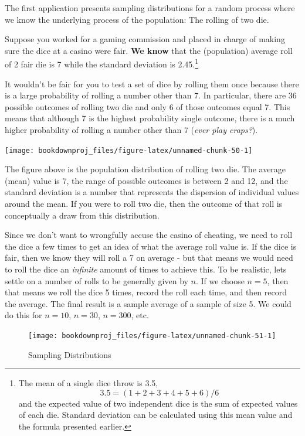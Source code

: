 \documentclass[
]{book}
\begin{document}
The first application presents sampling distributions for a random process where we know the underlying process of the population: The rolling of two die.

Suppose you worked for a gaming commission and placed in charge of making sure the dice at a casino were fair. \textbf{We know} that the (population) average roll of 2 fair die is 7 while the standard deviation is 2.45.\footnote{The mean of a single dice throw is 3.5,
  \[ 3.5 = (1 + 2 + 3 + 4 + 5 + 6) / 6\]
  and the expected value of two independent dice is the sum of expected values of each die. Standard deviation can be calculated using this mean value and the formula presented earlier.}

It wouldn't be fair for you to test a set of dice by rolling them once because there is a large probability of rolling a number other than 7. In particular, there are 36 possible outcomes of rolling two die and only 6 of those outcomes equal 7. This means that although 7 is the highest probability single outcome, there is a much higher probability of rolling a number other than 7 (\emph{ever play craps?}).

\begin{center}\texttt{[image: bookdownproj\_files/figure-latex/unnamed-chunk-50-1]} \end{center}

The figure above is the population distribution of rolling two die. The average (mean) value is 7, the range of possible outcomes is between 2 and 12, and the standard deviation is a number that represents the dispersion of individual values around the mean. If you were to roll two die, then the outcome of that roll is conceptually a draw from this distribution.

Since we don't want to wrongfully accuse the casino of cheating, we need to roll the dice a few times to get an idea of what the average roll value is. If the dice is fair, then we know they will roll a 7 on average - but that means we would need to roll the dice an \emph{infinite} amount of times to achieve this. To be realistic, lets settle on a number of rolls to be generally given by \(n\). If we choose \(n=5\), then that means we roll the dice 5 times, record the roll each time, and then record the average. The final result is a sample average of a sample of size 5. We could do this for \(n=10\), \(n=30\), \(n=300\), etc.

\begin{figure}

{\centering \texttt{[image: bookdownproj\_files/figure-latex/unnamed-chunk-51-1]} 

}

\caption{Sampling Distributions}\label{fig:unnamed-chunk-51}
\end{figure}
\end{document}
